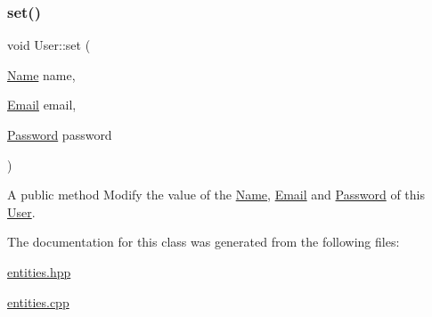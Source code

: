 \subsubsection{\texorpdfstring{set()}{set()}}
{\footnotesize\ttfamily void User\+::set (\begin{DoxyParamCaption}\item[{\hyperlink{class_name}{Name}}]{name,  }\item[{\hyperlink{class_email}{Email}}]{email,  }\item[{\hyperlink{class_password}{Password}}]{password }\end{DoxyParamCaption})}

A public method Modify the value of the \hyperlink{class_name}{Name}, \hyperlink{class_email}{Email} and \hyperlink{class_password}{Password} of this \hyperlink{class_user}{User}. 

The documentation for this class was generated from the following files\+:\begin{DoxyCompactItemize}
\item 
\hyperlink{entities_8hpp}{entities.\+hpp}\item 
\hyperlink{entities_8cpp}{entities.\+cpp}\end{DoxyCompactItemize}
